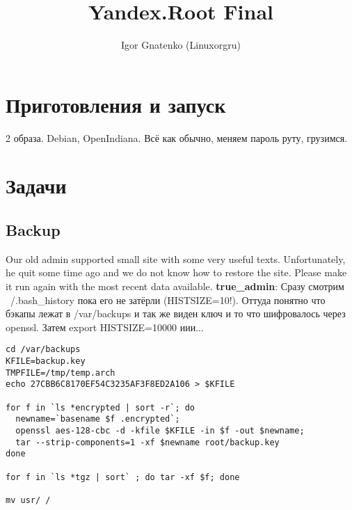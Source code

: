 \documentclass[a4paper,10pt]{report}
\title{Yandex.Root Final}
\author{Igor Gnatenko (Linuxorgru)}
\begin{document}
\maketitle
\tableofcontents

\begin{abstract}
\end{abstract}

\part{Приготовления и запуск}

2 образа. Debian, OpenIndiana. Всё как обычно, меняем пароль руту, грузимся.

\part{Задачи}

\chapter{Backup}
Our old admin supported small site with some very useful texts. Unfortunately, he quit some time ago and we do not know how to restore the site. Please make it run again with the most recent data available.
\newline\newline
\textbf{true\_admin}:
\newline
Сразу смотрим ~/.bash\_history пока его не затёрли (HISTSIZE=10!).
\newline
Оттуда понятно что бэкапы лежат в /var/backups и так же виден ключ и то что шифровалось через openssl.
\newline
Затем export HISTSIZE=10000 иии...
\newline
\begin{verbatim}
cd /var/backups
KFILE=backup.key
TMPFILE=/tmp/temp.arch
echo 27CBB6C8170EF54C3235AF3F8ED2A106 > $KFILE

for f in `ls *encrypted | sort -r`; do
  newname=`basename $f .encrypted`;
  openssl aes-128-cbc -d -kfile $KFILE -in $f -out $newname;
  tar --strip-components=1 -xf $newname root/backup.key
done

for f in `ls *tgz | sort` ; do tar -xf $f; done

mv usr/ /
\end{verbatim}
\end{document}
